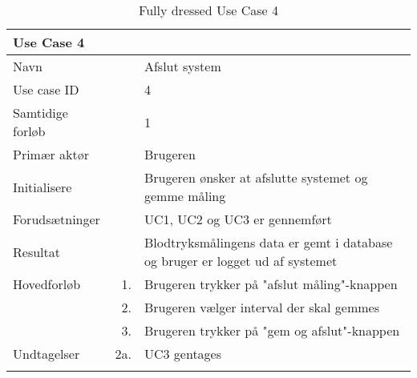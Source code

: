 \begin{longtabu} to  %
    {\large \textbf{Use Case 4}} && \\
    \toprule
    Navn &&    Afslut system\\
    Use case ID &&    4\\
    Samtidige forløb &&    1\\
    Primær aktør &&    Brugeren\\
    Initialisere &&    Brugeren ønsker at afslutte systemet og gemme måling\\
    Forudsætninger && UC1, UC2 og UC3 er gennemført\\
    Resultat &&    Blodtryksmålingens data er gemt i database og bruger er logget ud af systemet                    \\ \midrule
    Hovedforløb &    1. &    Brugeren trykker på "afslut måling"\--knappen\\[-1ex]   						 	
                &    2. &    Brugeren vælger interval der skal gemmes\\
                &    3. & Brugeren trykker på "gem og afslut"\--knappen\\ \midrule
                
    Undtagelser &    2a. & UC3 gentages    \\ \bottomrule
\caption{Fully dressed Use Case 4}
\label{UC4}
\end{longtabu}






















